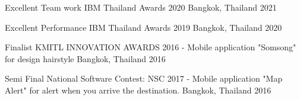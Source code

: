 


\begin{cvhonors}


  \cvhonor
  {Excellent Team work} %
  {IBM Thailand Awards 2020} %
  {Bangkok, Thailand} %
  {2021} %


  \cvhonor
    {Excellent Performance} %
    {IBM Thailand Awards 2019} %
    {Bangkok, Thailand} %
    {2020} %


  \cvhonor
    {Finalist} %
    {KMITL INNOVATION AWARDS 2016 - Mobile application "Somsong" for design hairstyle} %
    {Bangkok, Thailand} %
    {2016} %


  \cvhonor
  {Semi Final} %
  {National Software Contest: NSC 2017 - Mobile application "Map Alert" for alert when you arrive the destination.} %
  {Bangkok, Thailand} %
  {2016} %

\end{cvhonors}
